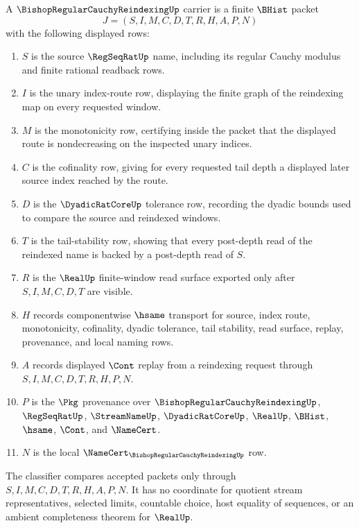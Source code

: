 \begin{definition}
\label{def:bishop-regular-cauchy-reindexing-carrier}
A $\BishopRegularCauchyReindexingUp$ carrier is a finite $\BHist$ packet
$$
J=(S,I,M,C,D,T,R,H,A,P,N)
$$
with the following displayed rows:
\begin{enumerate}
\item $S$ is the source $\RegSeqRatUp$ name, including its regular Cauchy modulus and finite rational readback rows.
\item $I$ is the unary index-route row, displaying the finite graph of the reindexing map on every requested window.
\item $M$ is the monotonicity row, certifying inside the packet that the displayed route is nondecreasing on the inspected unary indices.
\item $C$ is the cofinality row, giving for every requested tail depth a displayed later source index reached by the route.
\item $D$ is the $\DyadicRatCoreUp$ tolerance row, recording the dyadic bounds used to compare the source and reindexed windows.
\item $T$ is the tail-stability row, showing that every post-depth read of the reindexed name is backed by a post-depth read of $S$.
\item $R$ is the $\RealUp$ finite-window read surface exported only after $S,I,M,C,D,T$ are visible.
\item $H$ records componentwise $\hsame$ transport for source, index route, monotonicity, cofinality, dyadic tolerance, tail stability, read surface, replay, provenance, and local naming rows.
\item $A$ records displayed $\Cont$ replay from a reindexing request through $S,I,M,C,D,T,R,H,P,N$.
\item $P$ is the $\Pkg$ provenance over $\BishopRegularCauchyReindexingUp$, $\RegSeqRatUp$, $\StreamNameUp$, $\DyadicRatCoreUp$, $\RealUp$, $\BHist$, $\hsame$, $\Cont$, and $\NameCert$.
\item $N$ is the local $\NameCert_{\BishopRegularCauchyReindexingUp}$ row.
\end{enumerate}
The classifier compares accepted packets only through $S,I,M,C,D,T,R,H,A,P,N$. It has no coordinate for quotient stream representatives, selected limits, countable choice, host equality of sequences, or an ambient completeness theorem for $\RealUp$.
\end{definition}

